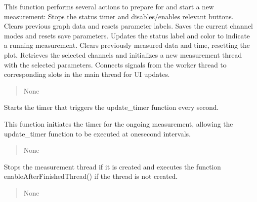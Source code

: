 \documentclass[letterpaper,10pt,english]{sphinxmanual}
\begin{document}
\begin{fulllineitems}
\begin{fulllineitems}
\sphinxAtStartPar
This function performs several actions to prepare for and start a new measurement:
\sphinxhyphen{} Stops the status timer and disables/enables relevant buttons.
\sphinxhyphen{} Clears previous graph data and resets parameter labels.
\sphinxhyphen{} Saves the current channel modes and resets save parameters.
\sphinxhyphen{} Updates the status label and color to indicate a running measurement.
\sphinxhyphen{} Clears previously measured data and time, resetting the plot.
\sphinxhyphen{} Retrieves the selected channels and initializes a new measurement thread with the selected parameters.
\sphinxhyphen{} Connects signals from the worker thread to corresponding slots in the main thread for UI updates.
\begin{quote}\begin{description}
\sphinxAtStartPar
None

\end{description}\end{quote}

\end{fulllineitems}


\begin{fulllineitems}
\label{\detokenize{FLIMGraphics:FLIMGraphics.FLIMGraphic.startTimer}}
\pysigstartsignatures
{}
\pysigstopsignatures
\sphinxAtStartPar
Starts the timer that triggers the update\_timer function every second.

\sphinxAtStartPar
This function initiates the timer for the ongoing measurement, allowing
the update\_timer function to be executed at one\sphinxhyphen{}second intervals.
\begin{quote}\begin{description}
\sphinxAtStartPar
None

\end{description}\end{quote}

\end{fulllineitems}


\begin{fulllineitems}
\label{\detokenize{FLIMGraphics:FLIMGraphics.FLIMGraphic.stopMeasurement}}
\pysigstartsignatures
{}
\pysigstopsignatures
\sphinxAtStartPar
Stops the measurement thread if it is created and executes the 
function enableAfterFinishedThread() if the thread is not created.
\begin{quote}\begin{description}
\sphinxAtStartPar
None


\end{description}
\end{quote}
\end{fulllineitems}
\end{fulllineitems}
\end{document}
